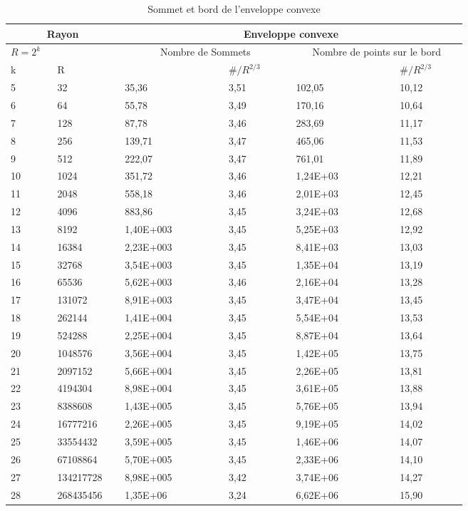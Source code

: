 \begin{table}[h!]
  \begin{tabular}{|p{0.09\linewidth}|p{0.13\linewidth}||p{0.2\linewidth}|p{0.13\linewidth}||p{0.2\linewidth}|p{0.13\linewidth}|}
    \hline
    \multicolumn{2}{|c||}{Rayon} & \multicolumn{4}{c|}{Enveloppe convexe} \\  \hline 
    $R=2^k$  &  & \multicolumn{2}{c||}{Nombre de Sommets} &  \multicolumn{2}{c|}{Nombre de points sur le bord} \\ \hline 
    k & R &   & $\# / R^{2/3}$  &   & $\# / R^{2/3}$ \\    
    \hline
    5 & 32 & 35,36 & 3,51 & 102,05 &  10,12\\
    6 & 64 & 55,78 & 3,49 & 170,16 &  10,64\\
    7 & 128 & 87,78 & 3,46 & 283,69 &  11,17\\
    8 & 256 & 139,71 & 3,47 & 465,06 &  11,53\\
    9 & 512 & 222,07 & 3,47 & 761,01 &  11,89\\
    10 & 1024 & 351,72 & 3,46 & 1,24E+03 &  12,21\\
    11 & 2048 & 558,18 & 3,46 & 2,01E+03 &  12,45\\
    12 & 4096 & 883,86 & 3,45 & 3,24E+03 &  12,68\\
    13 & 8192 & 1,40E+003 & 3,45 & 5,25E+03 &  12,92\\
    14 & 16384 & 2,23E+003 & 3,45 & 8,41E+03 &  13,03\\
    15 & 32768 & 3,54E+003 & 3,45 & 1,35E+04 &  13,19\\
    16 & 65536 & 5,62E+003 & 3,46 & 2,16E+04 &  13,28\\
    17 & 131072 & 8,91E+003 & 3,45 & 3,47E+04 &  13,45\\
    18 & 262144 & 1,41E+004 & 3,45 & 5,54E+04 &  13,53\\
    19 & 524288 & 2,25E+004 & 3,45 & 8,87E+04 &  13,64\\
    20 & 1048576 & 3,56E+004 & 3,45 & 1,42E+05 &  13,75\\
    21 & 2097152 & 5,66E+004 & 3,45 & 2,26E+05 &  13,81\\
    22 & 4194304 & 8,98E+004 & 3,45 & 3,61E+05 &  13,88\\
    23 & 8388608 & 1,43E+005 & 3,45 & 5,76E+05 &  13,94\\
    24 & 16777216 & 2,26E+005 & 3,45 & 9,19E+05 &  14,02\\
    25 & 33554432 & 3,59E+005 & 3,45 &  1,46E+06  &  14,07\\
    26 & 67108864 & 5,70E+005 & 3,45 &  2,33E+06  &  14,10\\
    27 & 134217728 & 8,98E+005 & 3,42 &  3,74E+06  &  14,27\\
    28 & 268435456 &  1,35E+06  & 3,24 &  6,62E+06  &  15,90\\
    \hline
  \end{tabular} 
  \caption{Sommet et bord de l'enveloppe convexe}
\end{table}

